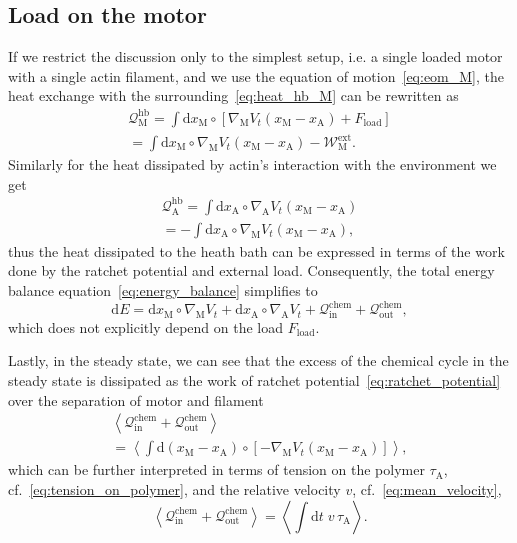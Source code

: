 \documentclass[aps,pre,twocolumn,showpacs,showkeys,superscriptaddress,floatfix]{revtex4-1}
\newcommand{\rmd}{{\mathrm d}}
\begin{document}
\subsection{Load on the motor}
If we restrict the discussion only to the simplest setup, i.e. a single loaded motor with a single actin filament,
and we use the equation of motion~\eqref{eq:eom_M}, 
the heat exchange with the surrounding~\eqref{eq:heat_hb_M} can be rewritten as 
\begin{multline}
{\mathcal Q}_\text{M}^\text{hb} 
= \int \rmd x_\text{M} \circ \left[ \nabla_\text{M} V_t(x_\text{M} - x_\text{A} ) + F_\text{load} \right] 
\\
= \int \rmd x_\text{M} \circ \nabla_\text{M} V_t(x_\text{M} - x_\text{A} ) - {\mathcal W}_\text{M}^\text{ext} .
\label{eq:heat_hb_M_expl}
\end{multline}
Similarly for the heat dissipated by actin's interaction with the environment we get 
\begin{multline}
{\mathcal Q}_\text{A}^\text{hb} 
= \int \rmd x_\text{A} \circ \nabla_\text{A} V_t(x_\text{M} - x_\text{A} )
\\
= - \int \rmd x_\text{A} \circ \nabla_\text{M} V_t(x_\text{M} - x_\text{A} ) ,
\label{eq:heat_hb_A_expl}
\end{multline}
thus the heat dissipated to the heath bath can be expressed in terms of the work done by the ratchet potential and external load. 
Consequently, the total energy balance equation~\eqref{eq:energy_balance} simplifies to 
\[
\rmd E 
= \rmd x_\text{M} \circ \nabla_\text{M} V_t  
+ \rmd x_\text{A} \circ \nabla_\text{A} V_t  
+ {\mathcal Q}_\text{in}^\text{chem}
+ {\mathcal Q}_\text{out}^\text{chem} , 
\]
which does not explicitly depend on the load $F_\text{load}$. 

Lastly, in the steady state, 
we can see that the excess of the chemical cycle in the steady state is dissipated as the work of ratchet potential~\eqref{eq:ratchet_potential} over the separation of motor and filament 
\begin{multline}
\left\langle 
{\mathcal Q}_\text{in}^\text{chem} + {\mathcal Q}_\text{out}^\text{chem} 
\right\rangle 
\\
= 
\left\langle 
\int \rmd \left( x_\text{M} - x_\text{A} \right) \circ \left[ - \nabla_\text{M} V_t( x_\text{M} - x_\text{A} ) \right]
\right\rangle ,
\label{eq:chemical_excess}
\end{multline} 
which can be further interpreted in terms of tension on the polymer $\tau_\text{A}$, cf.~\eqref{eq:tension_on_polymer}, and the relative velocity $v$, cf.~\eqref{eq:mean_velocity}, 
\begin{equation}
\left\langle 
{\mathcal Q}_\text{in}^\text{chem} + {\mathcal Q}_\text{out}^\text{chem} 
\right\rangle 
= \left\langle \int \rmd t \; v \, \tau_\text{A} \right\rangle .
\label{eq:excess_heat} 
\end{equation}
\end{document}
